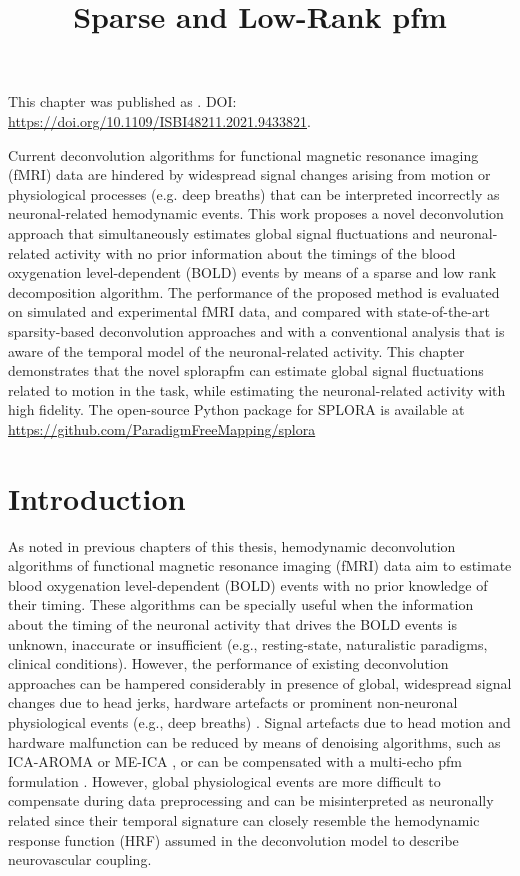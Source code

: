 \title{Sparse and Low-Rank \acrlong*{pfm}}
\label{cha:low-rank}

\begin{framed}\noindent This chapter was published as
    . DOI:
    \url{https://doi.org/10.1109/ISBI48211.2021.9433821}.
\end{framed}

Current deconvolution algorithms for functional magnetic resonance imaging
(fMRI) data are hindered by widespread signal changes arising from motion or
physiological processes (e.g. deep breaths) that can be interpreted incorrectly
as neuronal-related hemodynamic events. This work proposes a novel deconvolution
approach that simultaneously estimates global signal fluctuations and
neuronal-related activity with no prior information about the timings of the
blood oxygenation level-dependent (BOLD) events by means of a sparse and low
rank decomposition algorithm. The performance of the proposed method is
evaluated on simulated and experimental fMRI data, and compared with
state-of-the-art sparsity-based deconvolution approaches and with a conventional
analysis that is aware of the temporal model of the neuronal-related activity.
This chapter demonstrates that the novel \acrfull*{splorapfm} can estimate global
signal fluctuations related to motion in the task, while estimating the
neuronal-related activity with high fidelity. The open-source Python package for
SPLORA is available at
\url{https://github.com/ParadigmFreeMapping/splora}


\section{Introduction}
\label{sec:low_rank_intro}

As noted in previous chapters of this thesis, hemodynamic deconvolution
algorithms of functional magnetic resonance imaging (fMRI) data aim to estimate
blood oxygenation level-dependent (BOLD) events with no prior knowledge of their
timing. These algorithms can be specially useful when the information about the
timing of the neuronal activity that drives the BOLD events is unknown,
inaccurate or insufficient (e.g., resting-state, naturalistic paradigms,
clinical conditions). However, the performance of existing deconvolution
approaches can be hampered considerably in presence of global, widespread signal
changes due to head jerks, hardware artefacts or prominent non-neuronal
physiological events (e.g., deep breaths)
\citep{Power2017Sourcesimplicationswhole}. Signal artefacts due to head motion
and hardware malfunction can be reduced by means of denoising algorithms, such
as ICA-AROMA \citep{Pruim2015ICAAROMArobust} or ME-ICA
\citep{Kundu2012DifferentiatingBOLDnon}, or can be compensated with a multi-echo
\acrlong*{pfm} formulation
\citep{CaballeroGaudes2019deconvolutionalgorithmmulti}. However, global
physiological events are more difficult to compensate during data preprocessing
\citep{Power2018RiddingfMRIdata} and can be misinterpreted as neuronally related
since their temporal signature can closely resemble the hemodynamic response
function (HRF) assumed in the deconvolution model to describe neurovascular
coupling.

